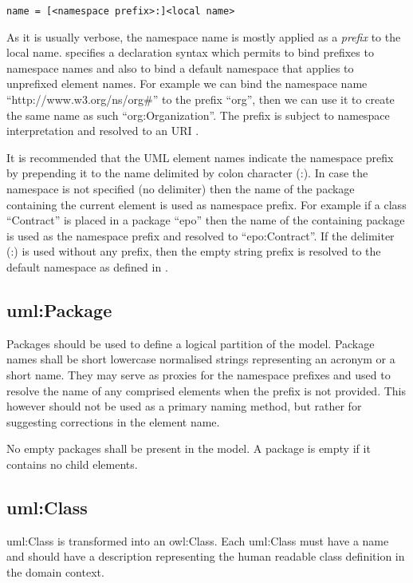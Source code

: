 	\texttt{name = [<namespace prefix>:]<local name>}
	
	As it is usually verbose, the namespace name is mostly applied as a \textit{prefix} to the local name. \cite{xml-namespaces} specifies a declaration syntax which permits to bind prefixes to namespace names and also to bind a default namespace that applies to unprefixed element names. 
	For example we can bind the namespace name ``http://www.w3.org/ns/org\#'' to the prefix ``org'', then we can use it to create the same name as such ``org:Organization''. The prefix is subject to namespace interpretation and resolved to an URI \cite{xml-namespaces}.
		
	It is recommended that the UML element names indicate the namespace prefix by prepending it to the name delimited by colon character (:). In case the namespace is not specified (no delimiter) then the name of the package containing the current element is used as namespace prefix. For example if a class ``Contract'' is placed in a package ``epo'' then the name of the containing package is used as the namespace prefix and resolved to ``epo:Contract''. If the delimiter (:) is used without any prefix, then the empty string prefix is resolved to the default namespace as defined in \citep{xml-namespaces}.
	
	\subsection{uml:Package}
	\label{sec:uml-package}
	
	Packages should be used to define a logical partition of the model. Package names shall be short lowercase normalised strings representing an acronym or a short name. They may serve as proxies for the namespace prefixes and used to resolve the name of any comprised elements when the prefix is not provided. This however should not be used as a primary naming method, but rather for suggesting corrections in the element name. 
	
	No empty packages shall be present in the model. A package is empty if it contains no child elements. 
	
	\subsection{uml:Class}
	\label{sec:uml-class}
	
	uml:Class is transformed into an owl:Class. Each uml:Class must have a name and should have a description representing the human readable class definition in the domain context. 
	
